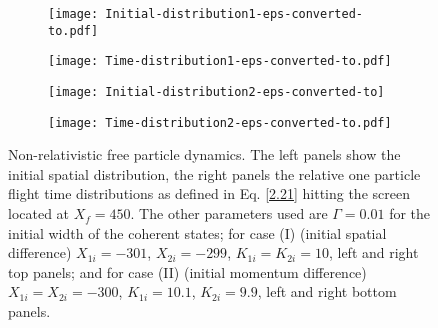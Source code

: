 \documentclass[preprint,aps]{revtex4}
\begin{document}
%
\begin{figure}
    \centering
    \begin{subfigure}[t]{0.45\textwidth}
        \centering	
        \texttt{[image: Initial-distribution1-eps-converted-to.pdf]}
        \label{fig1a}
    \end{subfigure}
\hfill
    \begin{subfigure}[t]{0.45\textwidth}
        \centering	
        \texttt{[image: Time-distribution1-eps-converted-to.pdf]}
        \label{fig1b}
    \end{subfigure}
    \begin{subfigure}[b]{0.45\textwidth}
	    \centering	
    	\texttt{[image: Initial-distribution2-eps-converted-to]}
	    \label{fig1c}
    \end{subfigure}
\hfill
    \begin{subfigure}[b]{0.45\textwidth}
    	\centering	
    	\texttt{[image: Time-distribution2-eps-converted-to.pdf]}
	     \label{fig1d}
    \end{subfigure}
\caption{Non-relativistic free particle dynamics. The left panels show the initial spatial distribution, the right panels the relative one particle flight time distributions as defined in Eq. \ref{2.21} hitting the screen located at $X_f=450$. The other parameters used are $\Gamma= 0.01$ for the initial width of the coherent states; for case (I) (initial spatial difference) $X_{1i}=-301$, $X_{2i}= -299$, $K_{1i}=K_{2i}=10$, left and right top panels; and for case (II) (initial momentum difference) $X_{1i}=X_{2i}= -300$,  $K_{1i}=10.1$, $K_{2i}=9.9$, left and right bottom panels.} \label{fig1}
\end{figure} 
\end{document}
